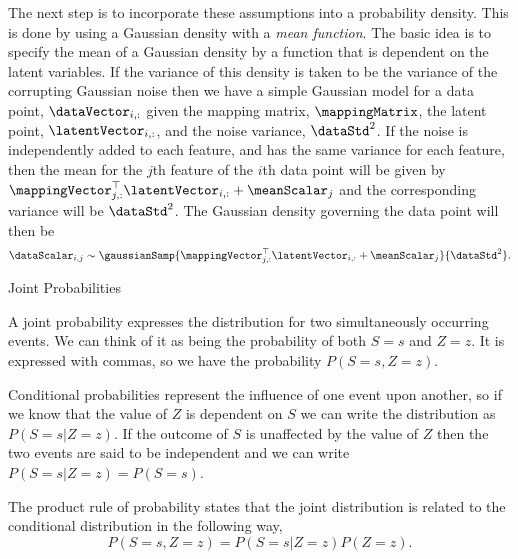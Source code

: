 The next step is to incorporate these assumptions into a probability
density. This is done by using a Gaussian density with a \emph{mean
  function}. The basic idea is to specify the mean of a Gaussian
density by a function that is dependent on the latent variables. If
the variance of this density is taken to be the variance of the
corrupting Gaussian noise then we have a simple Gaussian model for a
data point, $\dataVector_{i,:}$ given the mapping matrix,
$\mappingMatrix$, the latent point, $\latentVector_{i, :}$, and the
noise variance, $\dataStd^2$. If the noise is independently added to
each feature, and has the same variance for each feature, then the
mean for the $j$th feature of the $i$th data point will be given by
$\mappingVector_{j, :}^\top \latentVector_{i, :} + \meanScalar_j$ and
the corresponding variance will be $\dataStd^2$. The Gaussian density
governing the data point will then be
\[
\dataScalar_{i,j} \sim \gaussianSamp{\mappingVector_{j,
    :}^\top\latentVector_{i,:}+\meanScalar_j}{\dataStd^2}. \label{eqn:marginalDatum}
\]
% 
\begin{boxfloat}
  \caption{Joint Probabilities}\label{box:joint}

  \boxfontsize
  A joint probability expresses the distribution for two simultaneously
  occurring events. We can think of it as being the probability of both
  $S=s$ and $Z=z$. It is expressed with commas, so we have the
  probability $P(S=s, Z=z)$. 

  Conditional probabilities represent the influence of one event upon
  another, so if we know that the value of $Z$ is dependent on $S$ we
  can write the distribution as $P(S=s|Z=z)$. If the outcome of $S$ is
  unaffected by the value of $Z$ then the two events are said to be
  independent and we can write $P(S=s|Z=z)=P(S=s)$.

  The product rule of probability states that the joint distribution is
  related to the conditional distribution in the following way,
  \[
  P(S=s,Z=z)=P(S=s|Z=z)P(Z=z).
  \]
\end{boxfloat}

